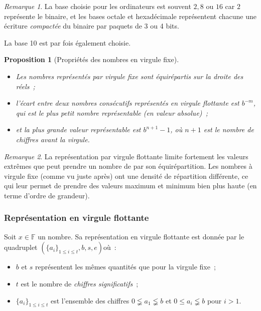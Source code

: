 \documentclass{article}
\newtheorem{prp}[thm]{Proposition}
\theoremstyle{definition}
\theoremstyle{remark}
\newtheorem*{rmq}{Remarque}
\newcommand{\F}{\mathbb F}
\begin{document}
		\begin{rmq} La base choisie pour les ordinateurs est souvent $2, 8$ ou $16$ car $2$ représente le binaire, et les bases octale et hexadécimale
		représentent chacune une écriture \emph{compactée} du binaire par paquets de 3 ou 4 bits.

		La base 10 est par fois également choisie.
		\end{rmq}

		\begin{prp}[Propriétés des nombres en virgule fixe]~
		\begin{itemize}
			\item Les nombres représentés par virgule fixe sont équirépartis sur la droite des réels~;
			\item l'écart entre deux nombres consécutifs représentés en virgule flottante est $b^{-m}$, qui est le plus petit nombre représentable
			      (en valeur absolue)~;
			\item et la plus grande valeur représentable est $b^{n+1}-1$, où $n+1$ est le nombre de chiffres avant la virgule.
		\end{itemize}
		\end{prp}

		\begin{rmq} La représentation par virgule flottante limite fortement les valeurs extrêmes que peut prendre un nombre de par son équirépartition. Les
		nombres à virgule fixe (comme vu juste après) ont une densité de répartition différente, ce qui leur permet de prendre des valeurs maximum et minimum
		bien plus haute (en terme d'ordre de grandeur).
		\end{rmq}

		\subsubsection{Représentation en virgule flottante}
		Soit $x \in \F$ un nombre. Sa représentation en virgule flottante est donnée par le quadruplet $(\{a_i\}_{1 \leq i \leq t}, b, s, e)$où~:
		\begin{itemize}
			\item $b$ et $s$ représentent les mêmes quantités que pour la virgule fixe~;
			\item $t$ est le nombre de \emph{chiffres significatifs}~;
			\item $\{a_i\}_{1 \leq i \leq t}$ est l'ensemble des chiffres $0 \lneqq a_1 \lneqq b$ et $0 \leq a_i \lneqq b$ pour $i > 1$.
		\end{itemize}
\end{document}
